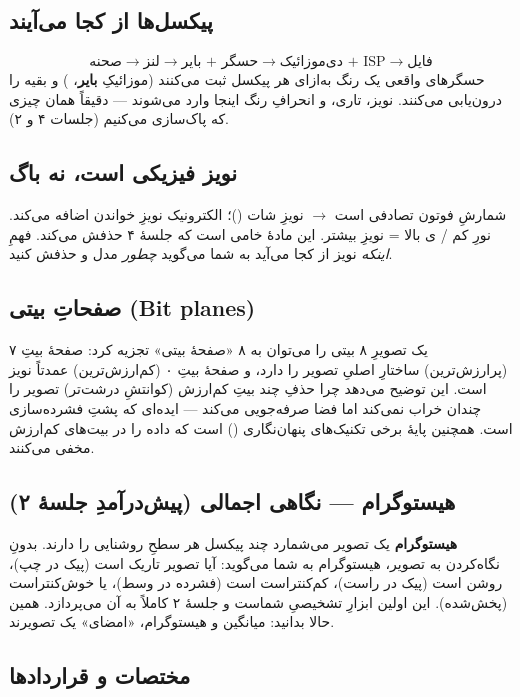 \documentclass[12pt,a4paper]{article}
\begin{document}
\subsection{پیکسل‌ها از کجا می‌آیند}

\[
\text{صحنه} \rightarrow \text{لنز} \rightarrow \text{حسگر + بایر} \rightarrow \text{دی‌موزائیک + ISP} \rightarrow \text{فایل}
\]
حسگرهای واقعی یک رنگ به‌ازای هر پیکسل ثبت می‌کنند (موزائیکِ \textbf{بایر}، ) و بقیه را
درون‌یابی می‌کنند. نویز، تاری، و انحرافِ رنگ اینجا وارد می‌شوند — دقیقاً همان چیزی که پاک‌سازی
می‌کنیم (جلسات ۴ و ۲).

\subsection{نویز فیزیکی است، نه باگ}

شمارشِ فوتون تصادفی است $\rightarrow$ نویزِ شات ()؛ الکترونیک نویزِ خواندن اضافه
می‌کند. نورِ کم / ی بالا = نویزِ بیشتر. این مادهٔ خامی است که جلسهٔ ۴ حذفش می‌کند. فهمِ
\emph{اینکه} نویز از کجا می‌آید به شما می‌گوید \emph{چطور} مدل و حذفش کنید.

\subsection{صفحاتِ بیتی (Bit planes)}

یک تصویرِ ۸ بیتی را می‌توان به ۸ «صفحهٔ بیتی» تجزیه کرد: صفحهٔ بیتِ ۷ (پرارزش‌ترین) ساختارِ
اصلیِ تصویر را دارد، و صفحهٔ بیتِ ۰ (کم‌ارزش‌ترین) عمدتاً نویز است. این توضیح می‌دهد چرا حذفِ
چند بیتِ کم‌ارزش (کوانتشِ درشت‌تر) تصویر را چندان خراب نمی‌کند اما فضا صرفه‌جویی می‌کند — ایده‌ای
که پشتِ فشرده‌سازی است. همچنین پایهٔ برخی تکنیک‌های پنهان‌نگاری () است که داده
را در بیت‌های کم‌ارزش مخفی می‌کنند.

\subsection{هیستوگرام — نگاهی اجمالی (پیش‌درآمدِ جلسهٔ ۲)}

\textbf{هیستوگرام} یک تصویر می‌شمارد چند پیکسل هر سطحِ روشنایی را دارند. بدونِ نگاه‌کردن به
تصویر، هیستوگرام به شما می‌گوید: آیا تصویر تاریک است (پیک در چپ)، روشن است (پیک در راست)،
کم‌کنتراست است (فشرده در وسط)، یا خوش‌کنتراست (پخش‌شده). این اولین ابزارِ تشخیصیِ شماست و جلسهٔ ۲
کاملاً به آن می‌پردازد. همین حالا بدانید: میانگین و هیستوگرام، «امضای» یک تصویرند.

\subsection{مختصات و قراردادها}
\end{document}
